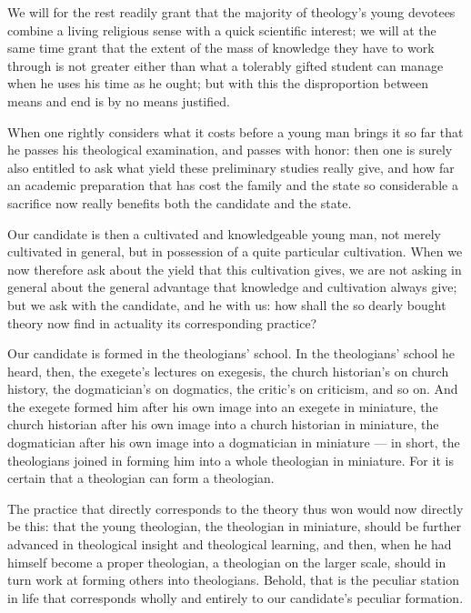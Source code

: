 \documentclass[12pt,a4paper]{book}
\begin{document}
We will for the rest readily grant that the majority of theology's young devotees combine a living
religious sense with a quick scientific interest; we will at the same time grant that the extent of
the mass of knowledge they have to work through is not
greater either than what a tolerably gifted student can manage when he uses his time as he ought;
but with this the disproportion between means and end is by no means justified.

When one rightly considers what it costs before a young man brings it so far that he passes his
theological examination, and passes with honor: then one is surely also entitled to ask what yield
these preliminary studies really give, and how far an academic preparation that has cost the family
and the state so considerable a sacrifice now really benefits both the candidate and the state.

Our candidate is then a cultivated and knowledgeable young man, not merely cultivated in general,
but in possession of a quite particular cultivation. When we now therefore ask about the yield that
this cultivation gives, we are not asking in general about the general advantage that knowledge and
cultivation always give; but we ask with the candidate, and he with us: how shall the so dearly
bought theory now find in actuality its corresponding practice?

Our candidate is formed in the theologians' school. In the theologians' school he heard, then, the
exegete's lectures on exegesis, the church historian's on church history, the dogmatician's on
dogmatics, the critic's on criticism, and so on. And the exegete formed him after his own image
into an exegete in miniature, the church historian after his own image into a church historian in
miniature, the dogmatician after his own image into a dogmatician in miniature --- in short, the
theologians joined in forming him into a whole theologian in miniature. For it is certain that a
theologian can form a theologian.

The practice that directly corresponds to the theory thus won would now directly be this: that the
young theologian, the theologian in miniature, should be further advanced in theological insight
and theological learning, and then, when he had himself become
a proper theologian, a theologian on the larger scale, should in turn work at forming others into
theologians. Behold, that is the peculiar station in life that corresponds wholly and entirely to
our candidate's peculiar formation.
\end{document}
